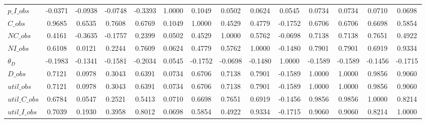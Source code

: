 \begin{center}
\begin{longtable}{lccccccccccccc}
$p\_I\_obs     $	 & 	         -0.0371	 & 	         -0.0938	 & 	         -0.0748	 & 	         -0.3393	 & 	          1.0000	 & 	          0.1049	 & 	          0.0502	 & 	          0.0624	 & 	          0.0545	 & 	          0.0734	 & 	          0.0734	 & 	          0.0710	 & 	          0.0698 \\ 
$C\_obs        $	 & 	          0.9685	 & 	          0.6535	 & 	          0.7608	 & 	          0.6769	 & 	          0.1049	 & 	          1.0000	 & 	          0.4529	 & 	          0.4779	 & 	         -0.1752	 & 	          0.6706	 & 	          0.6706	 & 	          0.6698	 & 	          0.5854 \\ 
$NC\_obs       $	 & 	          0.4161	 & 	         -0.3635	 & 	         -0.1757	 & 	          0.2399	 & 	          0.0502	 & 	          0.4529	 & 	          1.0000	 & 	          0.5762	 & 	         -0.0698	 & 	          0.7138	 & 	          0.7138	 & 	          0.7651	 & 	          0.4922 \\ 
$NI\_obs       $	 & 	          0.6108	 & 	          0.0121	 & 	          0.2244	 & 	          0.7609	 & 	          0.0624	 & 	          0.4779	 & 	          0.5762	 & 	          1.0000	 & 	         -0.1480	 & 	          0.7901	 & 	          0.7901	 & 	          0.6919	 & 	          0.9334 \\ 
${\theta_D}    $	 & 	         -0.1983	 & 	         -0.1341	 & 	         -0.1581	 & 	         -0.2034	 & 	          0.0545	 & 	         -0.1752	 & 	         -0.0698	 & 	         -0.1480	 & 	          1.0000	 & 	         -0.1589	 & 	         -0.1589	 & 	         -0.1456	 & 	         -0.1715 \\ 
$D\_obs        $	 & 	          0.7121	 & 	          0.0978	 & 	          0.3043	 & 	          0.6391	 & 	          0.0734	 & 	          0.6706	 & 	          0.7138	 & 	          0.7901	 & 	         -0.1589	 & 	          1.0000	 & 	          1.0000	 & 	          0.9856	 & 	          0.9060 \\ 
$util\_obs     $	 & 	          0.7121	 & 	          0.0978	 & 	          0.3043	 & 	          0.6391	 & 	          0.0734	 & 	          0.6706	 & 	          0.7138	 & 	          0.7901	 & 	         -0.1589	 & 	          1.0000	 & 	          1.0000	 & 	          0.9856	 & 	          0.9060 \\ 
$util\_C\_obs  $	 & 	          0.6784	 & 	          0.0547	 & 	          0.2521	 & 	          0.5413	 & 	          0.0710	 & 	          0.6698	 & 	          0.7651	 & 	          0.6919	 & 	         -0.1456	 & 	          0.9856	 & 	          0.9856	 & 	          1.0000	 & 	          0.8214 \\ 
$util\_I\_obs  $	 & 	          0.7039	 & 	          0.1930	 & 	          0.3958	 & 	          0.8012	 & 	          0.0698	 & 	          0.5854	 & 	          0.4922	 & 	          0.9334	 & 	         -0.1715	 & 	          0.9060	 & 	          0.9060	 & 	          0.8214	 & 	          1.0000 \\ 
\end{longtable}
 \end{center}
